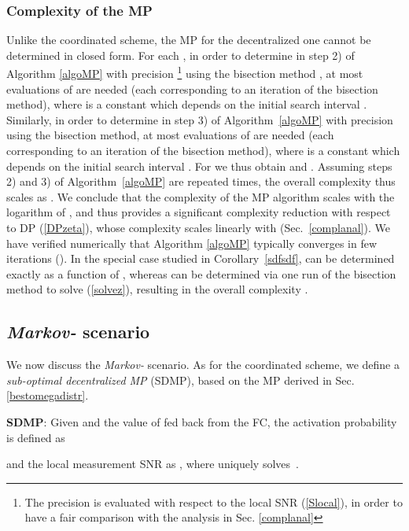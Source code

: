 \documentclass[10pt,twocolumn,twoside]{IEEEtran}
\theoremstyle{plain}
\begin{document}
\subsubsection{Complexity of the MP}
\label{complmpdec}
Unlike the coordinated scheme,
the MP for the decentralized one cannot be determined in closed form.
For each ,
in order to determine  in step 2) of Algorithm \ref{algoMP} with precision \footnote{The precision is evaluated with respect to the local SNR (\ref{Slocal}), in order to have a fair comparison with the analysis in Sec. \ref{complanal}} using the bisection method \cite{bisection},
at most 
evaluations of  are needed (each corresponding to an iteration of the bisection method), where 
 is a constant which depends on the initial search interval .
Similarly, in order to determine  in step 3) of Algorithm~\ref{algoMP} with precision  using the bisection method,
at most 
evaluations of  are needed (each corresponding to an iteration of the bisection method), where 
 is a constant which depends on the initial search interval .
For  we thus obtain  
and . 
Assuming steps 2) and 3) of Algorithm~\ref{algoMP}  are repeated  times, the
overall complexity thus scales as .
We conclude that the complexity of the MP algorithm scales with the logarithm of ,
and thus provides a significant complexity reduction with respect to DP (\ref{DPzeta}),
whose complexity scales linearly with  (Sec.~\ref{complanal}).
We have verified numerically that Algorithm \ref{algoMP} typically converges in few iterations ().
In the special case  studied in Corollary~\ref{sdfsdf},  can be determined exactly as a function of
, whereas 
 can be determined via one run of the bisection method \cite{bisection} to solve (\ref{solvez}), resulting in the overall complexity 
 .

 
 
\vspace{-3mm}
\subsection{\emph{Markov-} scenario}
\noindent We now discuss the \emph{Markov-} scenario.
 As for the coordinated scheme, we define a \emph{sub-optimal decentralized MP} (SDMP), based 
 on the MP derived in Sec. \ref{bestomegadistr}.
 
   \noindent\textbf{SDMP}: 
Given  and
the value of  fed back from the FC,
the activation probability is defined as

and the local measurement SNR as ,
where  uniquely solves~.
\hfill\QED
\end{document}
